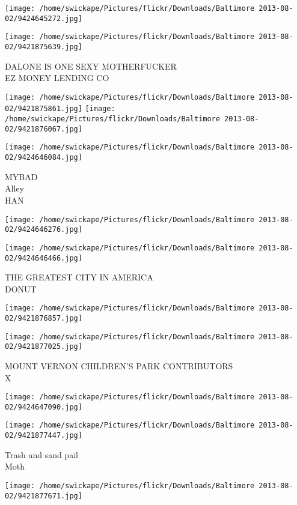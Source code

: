 \documentclass[10pt,letterpaper]{article}
\begin{document}
\texttt{[image: /home/swickape/Pictures/flickr/Downloads/Baltimore 2013-08-02/9424645272.jpg]}

\vspace{0.25in}
\texttt{[image: /home/swickape/Pictures/flickr/Downloads/Baltimore 2013-08-02/9421875639.jpg]}

DALONE IS ONE SEXY MOTHERFUCKER\\
EZ MONEY LENDING CO
\pagebreak

\texttt{[image: /home/swickape/Pictures/flickr/Downloads/Baltimore 2013-08-02/9421875861.jpg]}
\texttt{[image: /home/swickape/Pictures/flickr/Downloads/Baltimore 2013-08-02/9421876067.jpg]}

\texttt{[image: /home/swickape/Pictures/flickr/Downloads/Baltimore 2013-08-02/9424646084.jpg]}

MYBAD\\
Alley\\
HAN
\pagebreak

\texttt{[image: /home/swickape/Pictures/flickr/Downloads/Baltimore 2013-08-02/9424646276.jpg]}

\vspace{0.25in}
\texttt{[image: /home/swickape/Pictures/flickr/Downloads/Baltimore 2013-08-02/9424646466.jpg]}

THE GREATEST CITY IN AMERICA\\
DONUT
\pagebreak

\texttt{[image: /home/swickape/Pictures/flickr/Downloads/Baltimore 2013-08-02/9421876857.jpg]}

\vspace{0.25in}
\texttt{[image: /home/swickape/Pictures/flickr/Downloads/Baltimore 2013-08-02/9421877025.jpg]}

MOUNT VERNON CHILDREN'S PARK CONTRIBUTORS\\
X
\pagebreak

\texttt{[image: /home/swickape/Pictures/flickr/Downloads/Baltimore 2013-08-02/9424647090.jpg]}

\vspace{0.25in}
\texttt{[image: /home/swickape/Pictures/flickr/Downloads/Baltimore 2013-08-02/9421877447.jpg]}

Trash and sand pail\\
Moth
\pagebreak

\texttt{[image: /home/swickape/Pictures/flickr/Downloads/Baltimore 2013-08-02/9421877671.jpg]}
\end{document}
